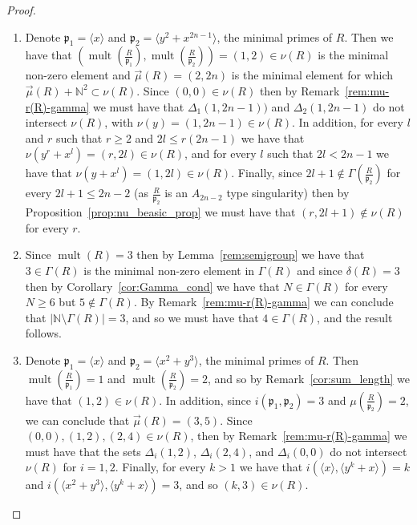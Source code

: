 \documentclass{article}
\DeclareMathOperator{\mult}{mult}
\numberwithin{theorem}{section}
\begin{document}
\begin{proof}
\begin{enumerate}
        \item Denote  $\mathfrak{p}_1 = \langle x \rangle$ and $\mathfrak{p}_2 = \langle y^2 + x^{2n-1} \rangle$, the minimal primes of $R$. Then we have that $\left(\mult\left(\frac{R}{\mathfrak{p}_1}\right), \mult\left(\frac{R}{\mathfrak{p}_2}\right)\right)=(1,2) \in \nu(R)$ is the minimal non-zero element and $\vec{\mu}(R)=(2, 2n)$ is the minimal element for which $\vec{\mu}(R)+ \mathbb{N}^2 \subset \nu(R)$. Since $(0,0) \in \nu(R)$ then by Remark~\ref{rem:mu-r(R)-gamma} we must have that $\Delta_1(1, 2n-1))$ and  $\Delta_2(1, 2n-1)$ do not intersect $\nu(R)$, with $\nu(y)=(1, 2n-1) \in \nu(R)$.  In addition, for every $l$ and $r$ such that $r \geq 2$ and $2l \leq r(2n-1)$ we have that $\nu(y^r+x^l)=(r, 2l) \in \nu(R)$, and for every $l$ such that $2l < 2n-1$ we have that $\nu(y+x^l)=(1,2l) \in \nu(R)$. Finally, since $2l+1 \notin \Gamma\left(\frac{R}{\mathfrak{p}_2}\right)$ for every $2l+1 \leq 2n-2$ (as $\frac{R}{\mathfrak{p}_2}$ is an $A_{2n-2}$ type singularity) then by Proposition~\ref{prop:nu_beasic_prop} we must have that $(r, 2l+1) \notin \nu(R)$ for every $r$.
        
        \item Since $\mult(R)=3$ then by Lemma~\ref{rem:semigroup} we have that $3 \in \Gamma(R)$ is the minimal non-zero element in $\Gamma(R)$ and since $\delta(R)=3$ then by Corollary~\ref{cor:Gamma_cond} we have that $N \in \Gamma(R)$ for every $N \geq 6$ but $5 \notin \Gamma(R)$. By Remark~\ref{rem:mu-r(R)-gamma} we can conclude that $|\mathbb{N} \setminus \Gamma(R)|=3$, and so we must have that $4 \in \Gamma(R)$, and the result follows. 
        
        \item Denote $\mathfrak{p}_1 = \langle x \rangle$ and $\mathfrak{p}_2 = \langle x^2 + y^3 \rangle$, the minimal primes of $R$. Then $\mult\left(\frac{R}{\mathfrak{p}_1}\right)=1$ and $\mult\left(\frac{R}{\mathfrak{p}_2}\right)=2$, and so by Remark~\ref{cor:sum_length} we have that $(1,2) \in \nu(R)$. In addition, since $i(\mathfrak{p}_1, \mathfrak{p}_2) = 3$ and $\mu\left(\frac{R}{\mathfrak{p}_2}\right)=2$, we can conclude that $\vec{\mu}(R)=(3,5)$. Since $(0,0), (1,2), (2,4) \in \nu(R)$, then by Remark~\ref{rem:mu-r(R)-gamma} we must have that the sets $\Delta_i(1,2)$, $\Delta_i(2,4)$, and $\Delta_i(0,0)$ do not intersect $\nu(R)$ for $i=1,2$. Finally, for every $k>1$ we have that $i(\langle x \rangle, \langle y^k +x \rangle) = k$ and $i(\langle x^2+y^3 \rangle, \langle y^k +x \rangle) = 3$, and so $(k,3) \in \nu(R)$. 
        

\end{enumerate}
\end{proof}
\end{document}
